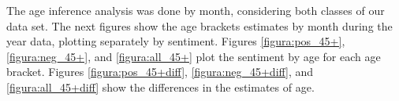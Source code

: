 \documentclass{sig-alternate}
\begin{document}

The age inference analysis was done by month, considering both classes of our data set. The next figures show the age brackets estimates by month during the year data, plotting separately by sentiment. Figures \ref{figura:pos_45+}, \ref{figura:neg_45+}, and \ref{figura:all_45+} plot the sentiment by age for each age bracket. Figures \ref{figura:pos_45+diff}, \ref{figura:neg_45+diff}, and \ref{figura:all_45+diff} show the differences in the estimates of age. 









\end{document}

